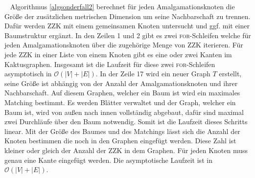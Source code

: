 \vspace{-2mm}
~\linebreak
Algorithmus \ref{algsonderfall2} berechnet für jeden Amalgamationsknoten die Größe der zusätzlichen metrischen Dimension um seine Nachbarschaft zu trennen. Dafür werden ZZK mit einem gemeinsamen Knoten untersucht und ggf. mit einer Baumstruktur ergänzt.\vspace{-1mm}\newline\newline %
In den Zeilen 1 und 2 gibt es zwei \textsc{for}-Schleifen welche für jeden Amalgamationsknoten über die zugehörige Menge von ZZK iterieren. Für jede ZZK in einer Liste von einem Knoten gibt es eine oder zwei Kanten im Kaktusgraphen. Insgesamt ist die Laufzeit für diese zwei \textsc{for}-Schleifen asymptotisch in $\mathcal{O}(|V|+|E|)$.\vspace{-1mm}\newline\newline
In der Zeile 17 wird ein neuer Graph $T$ erstellt, seine Größe ist abhängig von der Anzahl der Amalgamationsknoten und ihrer Nachbarschaft. Auf diesem Graphen, welcher ein Baum ist wird ein maximales Matching bestimmt. Es werden Blätter verwaltet und der Graph, welcher ein Baum ist, wird von außen nach innen vollständig abgebaut, dafür sind maximal zwei Durchläufe über den Baum notwendig. Somit ist die Laufzeit dieses Schritts linear.\vspace{-1mm}\newline\newline
Mit der Größe des Baumes und des Matchings lässt sich die Anzahl der Knoten bestimmen die noch in den Graphen eingefügt werden. Diese Zahl ist kleiner oder gleich der Anzahl der ZZK in dem Graphen. Für jeden Knoten muss genau eine Kante eingefügt werden. Die asymptotische Laufzeit ist in $\mathcal{O}(|V|+|E|)$.
